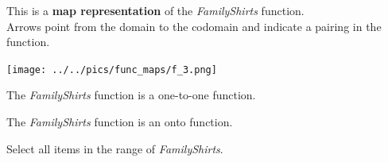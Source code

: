 \documentclass{ximera}
\author{Lee Wayand}
\begin{document}
\begin{exercise}

This is a \textbf{map representation} of the \textit{FamilyShirts} function. \\


Arrows point from the domain to the codomain and indicate a pairing in the function.


\begin{image}
\texttt{[image: ../../pics/func\_maps/f\_3.png]}
\end{image}




\begin{question} 
The \textit{FamilyShirts} function is a one-to-one function.

\begin{multipleChoice}
\end{multipleChoice}
\end{question}







\begin{question} 
The \textit{FamilyShirts} function is an onto function.

\begin{multipleChoice}
\end{multipleChoice}
\end{question}







\begin{question} 

Select all items in the range of \textit{FamilyShirts}.

\begin{selectAll}
\end{selectAll}
\end{question}












\end{exercise}
\end{document}
